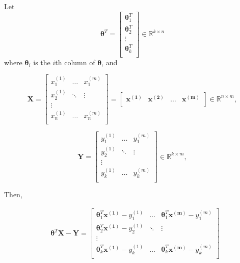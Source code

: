 \documentclass{article}
\begin{document}
Let 
$$
\boldsymbol \theta^T=
\begin{bmatrix}
\boldsymbol \theta_1^T\\
\boldsymbol \theta_2^T\\
\vdots\\
\boldsymbol \theta_k^T\\
\end{bmatrix} \in \mathbb{R}^{k\times n}
$$
where $\boldsymbol \theta_i$ is the $i$th column of $\boldsymbol \theta$, and

$$
\boldsymbol X=
\begin{bmatrix}
x_1^{(1)} & \hdots & x_1^{(m)}\\
x_2^{(1)} & \ddots &  \vdots\\
\vdots & \\
x_n^{(1)} & \hdots & x_n^{(m)}\\
\end{bmatrix}=
\begin{bmatrix}
\mathbf{x^{(1)}} & \mathbf{x^{(2)}} & \hdots & \mathbf{x^{(m)}}\\
\end{bmatrix}
\in \mathbb{R}^{n\times m},
$$

$$
\boldsymbol Y=
\begin{bmatrix}
y_1^{(1)} & \hdots & y_1^{(m)}\\
y_2^{(1)} & \ddots &  \vdots\\
\vdots & \\
y_k^{(1)} & \hdots & y_k^{(m)}\\
\end{bmatrix}  \in \mathbb{R}^{k\times m},
$$


Then, 

\begin{equation*} 
\begin{split}
&\boldsymbol \theta^T \mathbf{X-Y}=
\begin{bmatrix}
    \boldsymbol \theta_1^T \mathbf{x^{(1)}}-y_1^{(1)} & \hdots & \boldsymbol \theta_1^T \mathbf{x^{(m)}}-y_1^{(m)}\\
    \boldsymbol \theta_2^T \mathbf{x^{(1)}}-y_2^{(1)} & \ddots &  \vdots\\
    \vdots & \\
    \boldsymbol \theta_k^T \mathbf{x^{(1)}} - y_k^{(1)}& \hdots & \boldsymbol \theta_k^T \mathbf{x^{(m)}}-y_k^{(m)}\\
    \end{bmatrix}\\
\end{split}
\end{equation*}
\end{document}
